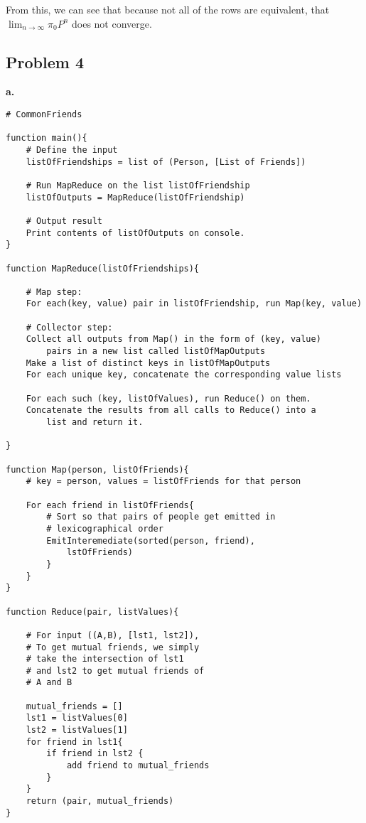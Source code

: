 \documentclass[12 pt]{article}
\begin{document}
	\noindent From this, we can see that because not all of the rows are equivalent, that $\lim_{n\rightarrow \infty} \pi_0 P^n$ does not converge. \\
	
	\newpage
	
	\subsection*{Problem 4}
	\noindent \textbf{a.}
	\begin{lstlisting}
# CommonFriends 

function main(){
	# Define the input
	listOfFriendships = list of (Person, [List of Friends])
	
	# Run MapReduce on the list listOfFriendship
	listOfOutputs = MapReduce(listOfFriendship)
	
	# Output result
	Print contents of listOfOutputs on console.
}

function MapReduce(listOfFriendships){

	# Map step:
	For each(key, value) pair in listOfFriendship, run Map(key, value)
	
	# Collector step:
	Collect all outputs from Map() in the form of (key, value)
		pairs in a new list called listOfMapOutputs
	Make a list of distinct keys in listOfMapOutputs
	For each unique key, concatenate the corresponding value lists
	
	For each such (key, listOfValues), run Reduce() on them.
	Concatenate the results from all calls to Reduce() into a 
		list and return it.

}

function Map(person, listOfFriends){
	# key = person, values = listOfFriends for that person
	
	For each friend in listOfFriends{
		# Sort so that pairs of people get emitted in
		# lexicographical order
		EmitInteremediate(sorted(person, friend), 
			lstOfFriends)
		}
	}
}

function Reduce(pair, listValues){
	
	# For input ((A,B), [lst1, lst2]),
	# To get mutual friends, we simply
	# take the intersection of lst1
	# and lst2 to get mutual friends of
	# A and B
	
	mutual_friends = []
	lst1 = listValues[0]
	lst2 = listValues[1]
	for friend in lst1{
		if friend in lst2 {
			add friend to mutual_friends
		}
	}
	return (pair, mutual_friends)
}
	\end{lstlisting}
	
\end{document}
